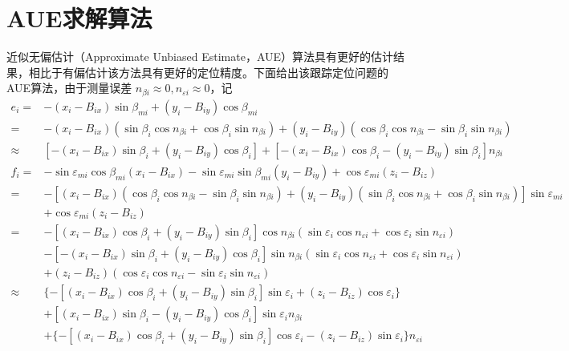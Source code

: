 \section{AUE求解算法}
近似无偏估计（Approximate Unbiased Estimate，AUE）算法具有更好的估计结果，相比于有偏估计该方法具有更好的定位精度。下面给出该跟踪定位问题的AUE算法，由于测量误差 $n_{\beta i} \approx 0,n_{\varepsilon i} \approx 0$，记
\begin{equation}
	\begin{split}
		e_i =& -(x_i-B_{ix})\sin\beta_{mi} + (y_i -B_{iy})\cos\beta_{mi} \\
		=&-(x_i -B_{ix})(\sin\beta_i\cos n_{\beta i}+ \cos\beta_i\sin n_{\beta i}) + (y_i -B_{iy})(\cos\beta_i\cos n_{\beta i} - \sin\beta_i \sin n_{\beta i}) \\
		\approx & [-(x_i-B_{ix})\sin\beta_i + (y_i -B_{iy})\cos\beta_i] + [-(x_i -B_{ix})\cos\beta_i -(y_i - B_{iy})\sin\beta_i]n_{\beta i} 
	\end{split}
\end{equation}
\begin{equation}
	\begin{split}
		f_i =& -\sin\varepsilon_{mi}\cos\beta_{mi}(x_i-B_{ix})-\sin\varepsilon_{mi}\sin\beta_{mi}(y_i -B_{iy}) + \cos\varepsilon_{mi}(z_i - B_{iz}) \\
		=&-[(x_i - B_{ix})(\cos\beta_i\cos n_{\beta i} -\sin\beta_i \sin n_{\beta i}) + (y_i -B_{iy})(\sin\beta_i\cos n_{\beta i} + \cos\beta_i \sin n_{\beta i})]\sin \varepsilon_{mi} \\
		&+ \cos\varepsilon_{mi}(z_i -B_{iz}) \\
		=&-[(x_i -B_{ix})\cos\beta_i + (y_i - B_{iy})\sin\beta_i]\cos n_{\beta i}(\sin\varepsilon_i \cos n_{\varepsilon i} + \cos\varepsilon_i \sin n_{\varepsilon i}) \\
		& - [-(x_i -B_{ix})\sin\beta_i + (y_i -B_{iy})\cos\beta_i]\sin n_{\beta i} (\sin\varepsilon_i \cos n_{\varepsilon i} + \cos \varepsilon_i \sin n_{\varepsilon i}) \\
		& + (z_i - B_{iz})(\cos\varepsilon_i \cos n_{\varepsilon i} - \sin\varepsilon_i \sin n_{\varepsilon i}) \\
		\approx & \lbrace -[(x_i -B_{ix})\cos\beta_i + (y_i -B_{iy})\sin\beta_i]\sin\varepsilon_i + (z_i -B_{iz})\cos\varepsilon_i \rbrace \\
		&+[(x_i -B_{ix})\sin\beta_i - (y_i -B_{iy})\cos\beta_i]\sin\varepsilon_i n_{\beta i} \\
		&+\lbrace -[(x_i -B_{ix})\cos\beta_i + (y_i -B_{iy})\sin\beta_i]\cos\varepsilon_i - (z_i -B_{iz})\sin\varepsilon_i \rbrace n_{\varepsilon i} 
	\end{split}
\end{equation}
